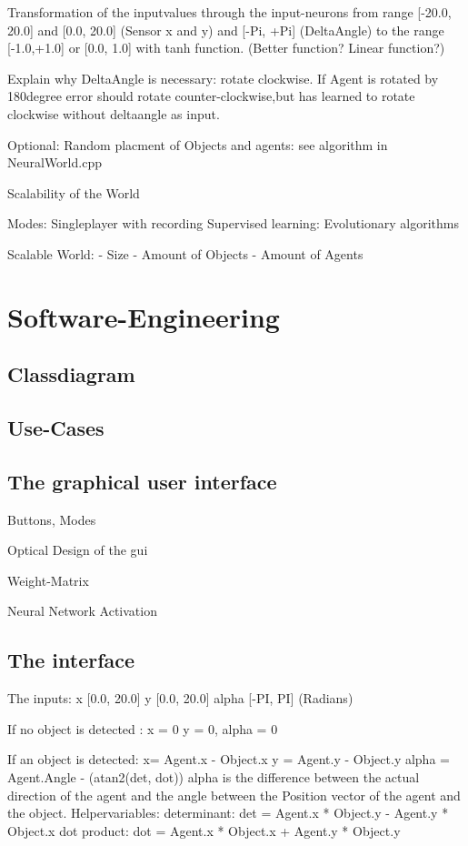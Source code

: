 \documentclass[10pt,a4paper,DIV=11]{scrreprt}
\begin{document}
Transformation of the inputvalues through the input-neurons from range [-20.0, 20.0] and [0.0, 20.0] (Sensor x and y) and [-Pi, +Pi] (DeltaAngle) to the range [-1.0,+1.0] or [0.0, 1.0] with tanh function. (Better function? Linear function?)

Explain why DeltaAngle is necessary:
rotate clockwise. If Agent is rotated by 180degree error should rotate counter-clockwise,but
has learned to rotate clockwise without deltaangle as input.


Optional: Random placment of Objects and agents: see algorithm in NeuralWorld.cpp



Scalability of the World


Modes:
Singleplayer with recording
Supervised learning:
Evolutionary algorithms

Scalable World:
- Size
- Amount of Objects
- Amount of Agents

\section{Software-Engineering}

\subsection{Classdiagram}

\subsection{Use-Cases}

\subsection{The graphical user interface}

Buttons, Modes

Optical Design of the gui

Weight-Matrix

Neural Network Activation

\subsection{The interface}


The inputs: 
x  [0.0, 20.0]
y   [0.0, 20.0]
alpha  [-PI, PI] (Radians)

If no object is detected :
x = 0
y = 0,
alpha = 0 

If an object is detected:
x= Agent.x - Object.x  
y = Agent.y - Object.y
alpha = Agent.Angle - (atan2(det, dot)) 
alpha is the difference between the actual direction of the agent and
the angle between the Position vector of the agent and the object. 
Helpervariables:
determinant: det =  Agent.x * Object.y - Agent.y * Object.x 
dot product:  dot =  Agent.x * Object.x + Agent.y * Object.y 
\end{document}
